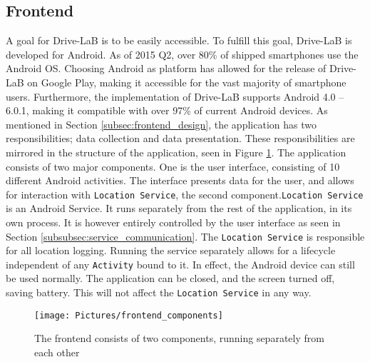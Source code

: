 \subsection{Frontend}\label{subsec:frontend_implementation}
A goal for Drive-LaB is to be easily accessible. To fulfill this goal, Drive-LaB is developed for Android. As of 2015 Q2, over 80\% of shipped smartphones use the Android OS\citep{smartphone_market_share}. Choosing Android as platform has allowed for the release of Drive-LaB on Google Play\citep{google_play_drivelab}, making it accessible for the vast majority of smartphone users. Furthermore, the implementation of Drive-LaB supports Android 4.0 – 6.0.1, making it compatible with over 97\% of current Android devices\citep{android_version_distribution}.
As mentioned in Section \ref{subsec:frontend_design}, the application has two responsibilities; data collection and data presentation. These responsibilities are mirrored in the structure of the application, seen in Figure \ref{fig:frontend_components}. The application consists of two major components. One is the user interface, consisting of 10 different Android activities\citep{android_activity}. The interface presents data for the user, and allows for interaction with \texttt{Location Service}, the second component.\texttt{Location Service} is an Android Service\citep{android_service}. It runs separately from the rest of the application, in its own process. It is however entirely controlled by the user interface as seen in Section \ref{subsubsec:service_communication}. The \texttt{Location Service} is responsible for all location logging. Running the service separately allows for a lifecycle independent of any \texttt{Activity} bound to it. In effect, the Android device can still be used normally. The application can be closed, and the screen turned off, saving battery. This will not affect the \texttt{Location Service} in any way.

\begin{figure}[tb]
\centering
\texttt{[image: Pictures/frontend\_components]}
\caption{The frontend consists of two components, running separately from each other}
\label{fig:frontend_components}
\end{figure}

